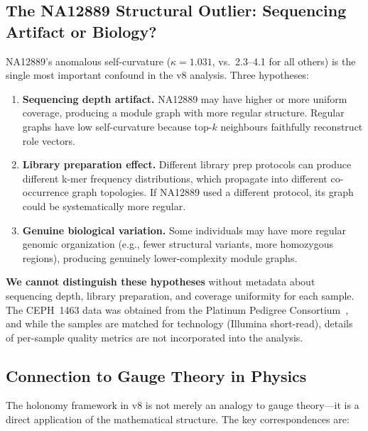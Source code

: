 \documentclass{../yalumba}
\begin{document}
\subsection{The NA12889 Structural Outlier: Sequencing Artifact or Biology?}

NA12889's anomalous self-curvature ($\kappa = 1.031$, vs.\ 2.3--4.1 for
all others) is the single most important confound in the v8 analysis.
Three hypotheses:

\begin{enumerate}
  \item \textbf{Sequencing depth artifact.}  NA12889 may have higher or
    more uniform coverage, producing a module graph with more regular
    structure.  Regular graphs have low self-curvature because top-$k$
    neighbours faithfully reconstruct role vectors.
  \item \textbf{Library preparation effect.}  Different library prep
    protocols can produce different k-mer frequency distributions, which
    propagate into different co-occurrence graph topologies.  If NA12889
    used a different protocol, its graph could be systematically more
    regular.
  \item \textbf{Genuine biological variation.}  Some individuals may have
    more regular genomic organization (e.g., fewer structural variants,
    more homozygous regions), producing genuinely lower-complexity module
    graphs.
\end{enumerate}

\begin{limitation}
\textbf{We cannot distinguish these hypotheses} without metadata about
sequencing depth, library preparation, and coverage uniformity for each
sample.  The CEPH~1463 data was obtained from the Platinum Pedigree
Consortium~\cite{ceph1463}, and while the samples are matched for
technology (Illumina short-read), details of per-sample quality metrics
are not incorporated into the analysis.
\end{limitation}

\subsection{Connection to Gauge Theory in Physics}

The holonomy framework in v8 is not merely an analogy to gauge theory---it
is a direct application of the mathematical structure.  The key
correspondences are:
\end{document}
